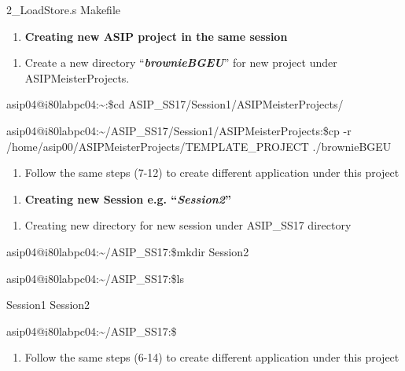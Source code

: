 \documentclass[
]{article}
\begin{document}
2\_LoadStore.s Makefile

\begin{enumerate}
\def\labelenumi{\Alph{enumi}.}
\setcounter{enumi}{1}
\item
  \textbf{Creating new ASIP project in the same session}
\end{enumerate}

\begin{enumerate}
\def\labelenumi{\arabic{enumi}.}
\setcounter{enumi}{13}
\item
  Create a new directory ``\emph{\textbf{brownieBGEU}}'' for new project
  under ASIPMeisterProjects.
\end{enumerate}

asip04@i80labpc04:\textasciitilde:\$cd
ASIP\_SS17/Session1/ASIPMeisterProjects/

asip04@i80labpc04:\textasciitilde/ASIP\_SS17/Session1/ASIPMeisterProjects:\$cp
-r /home/asip00/ASIPMeisterProjects/TEMPLATE\_PROJECT ./brownieBGEU

\begin{enumerate}
\def\labelenumi{\arabic{enumi}.}
\setcounter{enumi}{14}
\item
  Follow the same steps (7-12) to create different application under
  this project
\end{enumerate}

\begin{enumerate}
\def\labelenumi{\Alph{enumi}.}
\setcounter{enumi}{2}
\item
  \textbf{Creating new Session e.g. ``\emph{Session2}''}
\end{enumerate}

\begin{enumerate}
\def\labelenumi{\arabic{enumi}.}
\setcounter{enumi}{15}
\item
  Creating new directory for new session under ASIP\_SS17 directory
\end{enumerate}

asip04@i80labpc04:\textasciitilde/ASIP\_SS17:\$mkdir Session2

asip04@i80labpc04:\textasciitilde/ASIP\_SS17:\$ls

Session1 Session2

asip04@i80labpc04:\textasciitilde/ASIP\_SS17:\$

\begin{enumerate}
\def\labelenumi{\arabic{enumi}.}
\setcounter{enumi}{16}
\item
  Follow the same steps (6-14) to create different application under
  this project
\end{enumerate}
\end{document}
